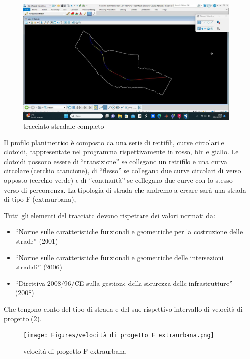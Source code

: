 \begin{figure}[H]
    \includegraphics[width=\textwidth]{Figures/tracciato stradale completo.jpg}
      \caption{tracciato stradale completo}
      \label{tracciato stradale completo}
\end{figure}

Il profilo planimetrico è composto da una serie di rettifili, curve circolari e clotoidi, rappresentate nel programma rispettivamente in rosso, blu e giallo.
Le clotoidi possono essere di “transizione” se collegano un rettifilo e una curva circolare (cerchio arancione), di “flesso” se collegano due curve circolari di verso opposto (cerchio verde) e di “continuità” se collegano due curve con lo stesso verso di percorrenza.
La tipologia di strada che andremo a creare sarà una strada di tipo F (extraurbana), 


Tutti gli elementi del tracciato devono rispettare dei valori normati da:

\begin{itemize}
    \item[\bullet] “Norme sulle caratteristiche funzionali e geometriche per la costruzione delle strade” (2001) 
    \item[\bullet] “Norme sulle caratteristiche funzionali e geometriche delle intersezioni stradali” (2006)
    \item[\bullet] “Direttiva 2008/96/CE sulla gestione della sicurezza delle infrastrutture” (2008)
\end{itemize}

Che tengono conto del tipo di strada e del suo rispettivo intervallo di velocità di progetto (\ref{velocitàdiprogetto}).

\begin{figure}[H]
    \texttt{[image: Figures/velocità di progetto F extraurbana.png]}
      \caption{velocità di progetto F extraurbana}
      \label{velocitàdiprogetto}
\end{figure}

